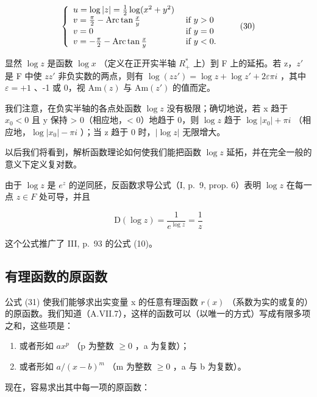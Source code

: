 \[
\left\{ \begin{array}{l l} u = \log | z | = \frac {1}{2} \log (x ^ {2} + y ^ {2}) \\ v = \frac {\pi}{2} - \operatorname{Arc} \tan \frac {x}{y} & \text { if } y > 0 \\ v = 0 & \text { if } y = 0 \\ v = - \frac {\pi}{2} - \operatorname{Arc} \tan \frac {x}{y} & \text { if } y <   0. \end{array} \right.\tag{30}
\]

显然 \(\log z\) 是函数 \(\log x\) （定义在正开实半轴 \(R_{+}^{*}\) 上）到 F 上的延拓。若 z，\(z'\) 是 F 中使 \(zz'\) 非负实数的两点，则有 \(\log(zz') = \log z + \log z' + 2\varepsilon\pi i\) ，其中 \(\varepsilon = +1\) 、-1 或 0，视 \(\mathrm{Am}(z)\) 与 \(\mathrm{Am}(z')\) 的值而定。

我们注意，在负实半轴的各点处函数 \(\log z\) 没有极限；确切地说，若 x 趋于 \(x_{0} < 0\) 且 y 保持 \textgreater{} 0（相应地，\textless{} 0）地趋于 0，则 \(\log z\) 趋于 \(\log |x_{0}| + \pi i\) （相应地，\(\log |x_{0}| - \pi i\) ）；当 z 趋于 0 时，\(|\log z|\) 无限增大。

以后我们将看到，解析函数理论如何使我们能把函数 \(\log z\) 延拓，并在完全一般的意义下定义复对数。

由于 \(\log z\) 是 \(e^{z}\) 的逆同胚，反函数求导公式（I, p.~9, prop. 6）表明 \(\log z\) 在每一点 \(z \in F\) 处可导，并且

\[
\mathrm{D} (\log z) = \frac {1}{e ^ {\log z}} = \frac {1}{z}\tag{31}
\]

这个公式推广了 III, p.~93 的公式 (10)。

\subsection{有理函数的原函数}

公式 (31) 使我们能够求出实变量 x 的任意有理函数 \(r(x)\) （系数为实的或复的）的原函数。我们知道（A.VII.7），这样的函数可以（以唯一的方式）写成有限多项之和，这些项是：

\begin{enumerate}
\def\labelenumi{\alph{enumi})}
\item
  或者形如 \(ax^{p}\) （p 为整数 \(\geqslant 0\) ，a 为复数）；
\item
  或者形如 \(a/(x - b)^{m}\) （m 为整数 \(\geqslant 0\) ，a 与 b 为复数）。
\end{enumerate}

现在，容易求出其中每一项的原函数：

